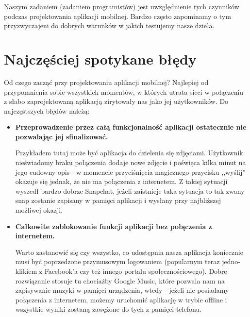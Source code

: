 \documentclass[a4paper, 12pt]{article}
\begin{document}
Naszym zadaniem (zadaniem programistów) jest uwzględnienie tych czynników podczas projektowania aplikacji mobilnej. Bardzo często zapominamy o tym przyzwyczajeni do dobrych warunków w jakich testujemy nasze dzieła.

\section{Najczęściej spotykane błędy}
Od czego zacząć przy projektowaniu aplikacji mobilnej? Najlepiej od przypomnienia sobie wszystkich momentów, w których utrata sieci w połączeniu z słabo zaprojektowaną aplikacją zirytowały nas jako jej użytkowników. Do najczęstszych błędów należą:
\begin{itemize}
\item \textbf{Przeprowadzenie przez całą funkcjonalność aplikacji ostatecznie nie pozwalając jej sfinalizować.} 

Przykładem tutaj może być aplikacja do dzielenia się zdjęciami. Użytkownik nieświadomy braku połączenia dodaje nowe zdjęcie i poświęca kilka minut na jego cudowny opis - w momencie przyciśnięcia magicznego przycisku ,,wyślij'' okazuje się jednak, że nie ma połączenia z internetem. Z takiej sytuacji wyszedł bardzo dobrze Snapchat, jeżeli zaistnieje taka sytuacja to tak zwany snap zostanie zapisany w pamięci aplikacji i wysłany przy najbliższej możliwej okazji.
\item \textbf{Całkowite zablokowanie funkcji aplikacji bez połączenia z internetem. }

Warto zastanowić się czy wszystko, co udostępnia nasza aplikacja koniecznie musi być poprzedzone przymusowym logowaniem (popularnym teraz jedno-klikiem z Facebook'a czy też innego portalu społecznościowego). Dobre rozwiązanie stosuje tu chociażby Google Music, które pozwala nam na zapisywanie muzyki w pamięci urządzenia, wtedy - jeżeli nie posiadamy połączenia z internetem, możemy uruchomić aplikację w trybie offline i wszystkie wyniki zostaną zawężone do tych z pamięci telefonu.
\end{itemize}
\end{document}
